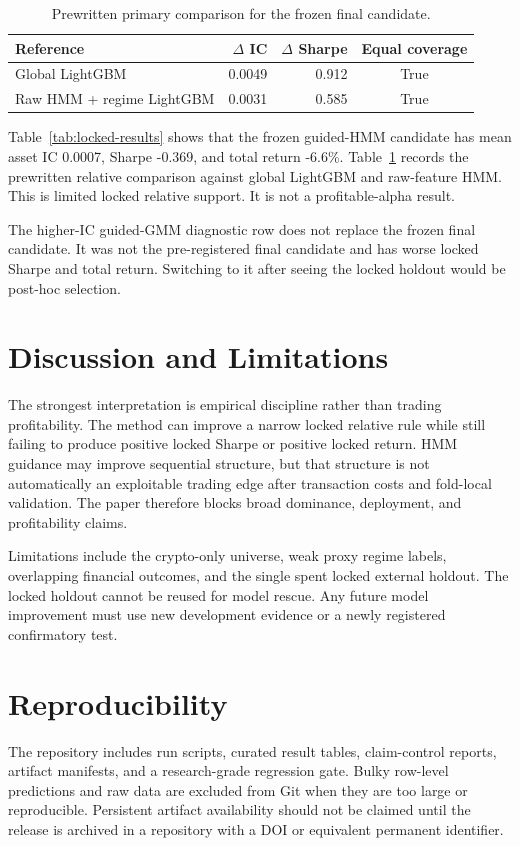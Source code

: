 \documentclass[sigconf,anonymous,review]{acmart}
\begin{document}
\begin{table}[t]
\caption{Prewritten primary comparison for the frozen final candidate.}
\label{tab:primary-rule}
\begin{tabular}{lrrc}
\toprule
Reference & $\Delta$ IC & $\Delta$ Sharpe & Equal coverage \\
\midrule
Global LightGBM & 0.0049 & 0.912 & True \\
Raw HMM + regime LightGBM & 0.0031 & 0.585 & True \\
\bottomrule
\end{tabular}
\end{table}

Table~\ref{tab:locked-results} shows that the frozen guided-HMM candidate has mean asset IC 0.0007, Sharpe -0.369, and total return -6.6\%. Table~\ref{tab:primary-rule} records the prewritten relative comparison against global LightGBM and raw-feature HMM. This is limited locked relative support. It is not a profitable-alpha result.

The higher-IC guided-GMM diagnostic row does not replace the frozen final candidate. It was not the pre-registered final candidate and has worse locked Sharpe and total return. Switching to it after seeing the locked holdout would be post-hoc selection.

\section{Discussion and Limitations}
The strongest interpretation is empirical discipline rather than trading profitability. The method can improve a narrow locked relative rule while still failing to produce positive locked Sharpe or positive locked return. HMM guidance may improve sequential structure, but that structure is not automatically an exploitable trading edge after transaction costs and fold-local validation. The paper therefore blocks broad dominance, deployment, and profitability claims.

Limitations include the crypto-only universe, weak proxy regime labels, overlapping financial outcomes, and the single spent locked external holdout. The locked holdout cannot be reused for model rescue. Any future model improvement must use new development evidence or a newly registered confirmatory test.

\section{Reproducibility}
The repository includes run scripts, curated result tables, claim-control reports, artifact manifests, and a research-grade regression gate. Bulky row-level predictions and raw data are excluded from Git when they are too large or reproducible. Persistent artifact availability should not be claimed until the release is archived in a repository with a DOI or equivalent permanent identifier.
\end{document}
